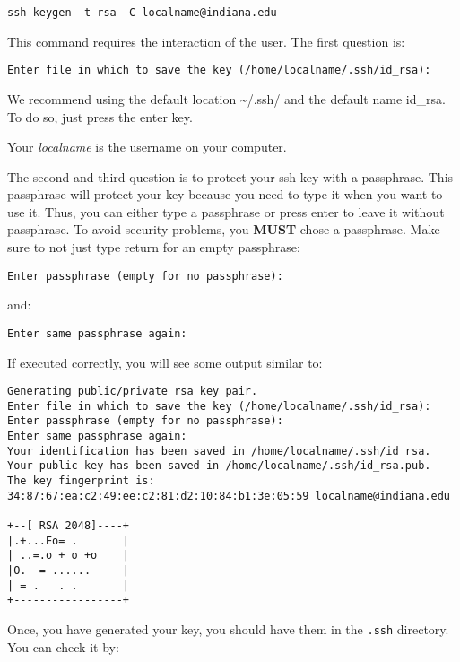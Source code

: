 \begin{verbatim}
ssh-keygen -t rsa -C localname@indiana.edu
\end{verbatim}

This command requires the interaction of the user. The first question
is:

\begin{verbatim}
Enter file in which to save the key (/home/localname/.ssh/id_rsa): 
\end{verbatim}

We recommend using the default location \textasciitilde{}/.ssh/ and the
default name id\_rsa. To do so, just press the enter key.

Your \emph{localname} is the username on your computer.

The second and third question is to protect your ssh key with a
passphrase. This passphrase will protect your key because you need to
type it when you want to use it. Thus, you can either type a passphrase
or press enter to leave it without passphrase. To avoid security
problems, you \textbf{MUST} chose a passphrase. Make sure to not just
type return for an empty passphrase:

\begin{verbatim}
Enter passphrase (empty for no passphrase):
\end{verbatim}

and:

\begin{verbatim}
Enter same passphrase again:
\end{verbatim}

If executed correctly, you will see some output similar to:

\begin{verbatim}
Generating public/private rsa key pair.
Enter file in which to save the key (/home/localname/.ssh/id_rsa): 
Enter passphrase (empty for no passphrase):
Enter same passphrase again:
Your identification has been saved in /home/localname/.ssh/id_rsa.
Your public key has been saved in /home/localname/.ssh/id_rsa.pub.
The key fingerprint is:
34:87:67:ea:c2:49:ee:c2:81:d2:10:84:b1:3e:05:59 localname@indiana.edu

+--[ RSA 2048]----+
|.+...Eo= .       |
| ..=.o + o +o    |
|O.  = ......     |
| = .   . .       |
+-----------------+
\end{verbatim}


Once, you have generated your key, you should have them in the \verb|.ssh|
directory. You can check it by:

